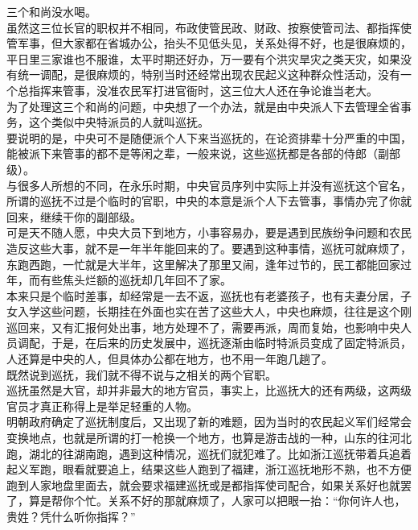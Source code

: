 \begin{multicols}{\theparacolNo}
三个和尚没水喝。\\

虽然这三位长官的职权并不相同，布政使管民政、财政、按察使管司法、都指挥使管军事，但大家都在省城办公，抬头不见低头见，关系处得不好，也是很麻烦的，平日里三家谁也不服谁，太平时期还好办，万一要有个洪灾旱灾之类天灾，如果没有统一调配，是很麻烦的，特别当时还经常出现农民起义这种群众性活动，没有一个总指挥来管事，没准农民军打进官衙时，这三位大人还在争论谁当老大。\\

为了处理这三个和尚的问题，中央想了一个办法，就是由中央派人下去管理全省事务，这个类似中央特派员的人就叫巡抚。\\

要说明的是，中央可不是随便派个人下来当巡抚的，在论资排辈十分严重的中国，能被派下来管事的都不是等闲之辈，一般来说，这些巡抚都是各部的侍郎（副部级）。\\

与很多人所想的不同，在永乐时期，中央官员序列中实际上并没有巡抚这个官名，所谓的巡抚不过是个临时的官职，中央的本意是派个人下去管事，事情办完了你就回来，继续干你的副部级。\\

可是天不随人愿，中央大员下到地方，小事容易办，要是遇到民族纷争问题和农民造反这些大事，就不是一年半年能回来的了。要遇到这种事情，巡抚可就麻烦了，东跑西跑，一忙就是大半年，这里解决了那里又闹，逢年过节的，民工都能回家过年，而有些焦头烂额的巡抚却几年回不了家。\\

本来只是个临时差事，却经常是一去不返，巡抚也有老婆孩子，也有夫妻分居，子女入学这些问题，长期挂在外面也实在苦了这些大人，中央也麻烦，往往是这个刚巡回来，又有汇报何处出事，地方处理不了，需要再派，周而复始，也影响中央人员调配，于是，在后来的历史发展中，巡抚逐渐由临时特派员变成了固定特派员，人还算是中央的人，但具体办公都在地方，也不用一年跑几趟了。\\

既然说到巡抚，我们就不得不说与之相关的两个官职。\\

巡抚虽然是大官，却并非最大的地方官员，事实上，比巡抚大的还有两级，这两级官员才真正称得上是举足轻重的人物。\\

明朝政府确定了巡抚制度后，又出现了新的难题，因为当时的农民起义军们经常会变换地点，也就是所谓的打一枪换一个地方，也算是游击战的一种，山东的往河北跑，湖北的往湖南跑，遇到这种情况，巡抚们就犯难了。比如浙江巡抚带着兵追着起义军跑，眼看就要追上，结果这些人跑到了福建，浙江巡抚地形不熟，也不方便跑到人家地盘里面去，就会要求福建巡抚或是都指挥使司配合，如果关系好也就罢了，算是帮你个忙。关系不好的那就麻烦了，人家可以把眼一抬：“你何许人也，贵姓？凭什么听你指挥？”\\


\end{multicols}
